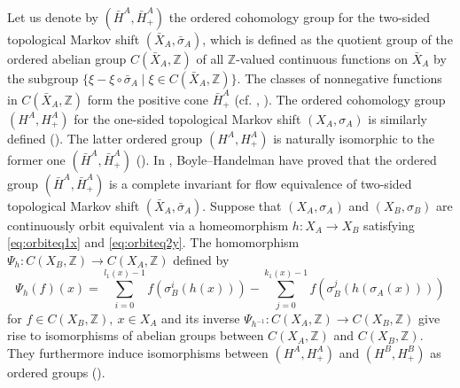 \documentclass[11pt]{article}
\theoremstyle{plain}
\theoremstyle{definition}
\numberwithin{equation}{section}
\newcommand{\Z}{\mathbb{Z}}
\begin{document}
Let us denote by
$(\bar{H}^A,\bar{H}^A_+)$
the ordered cohomology group 
for the two-sided topological Markov shift $(\bar{X}_A,\bar{\sigma}_A)$,
which is defined as the quotient group of the ordered abelian group
$C(\bar{X}_A,{\mathbb{Z}})$ of all ${\mathbb{Z}}$-valued continuous functions 
on $\bar{X}_A$ by the subgroup
$\{ \xi - \xi \circ \bar{\sigma}_A \mid \xi \in C(\bar{X}_A,{\mathbb{Z}}) \}$.
The classes of nonnegative functions in $C(\bar{X}_A,{\mathbb{Z}})$ 
form the positive cone $\bar{H}^A_+$ 
(cf. \cite{BH}, \cite{Po}).
The ordered cohomology group
$(H^A,H^A_+)$
for the one-sided topological Markov shift $(X_A,\sigma_A)$
is similarly defined (\cite{MMKyoto}).
The latter ordered group  
$(H^A,H^A_+)$ is naturally isomorphic to the former one  
$(\bar{H}^A,\bar{H}^A_+)$ (\cite[Lemma 3.1]{MMKyoto}).
In \cite{BH}, Boyle--Handelman have proved that 
the ordered group
$(\bar{H}^A,\bar{H}^A_+)$ 
is a complete invariant for  flow equivalence  of 
two-sided topological Markov shift
$(\bar{X}_A, \bar{\sigma}_A)$.
Suppose that $(X_A, \sigma_A)$ and $(X_B,\sigma_B)$ 
are continuously orbit equivalent
via a homeomorphism $h:X_A\rightarrow X_B$
satisfying \eqref{eq:orbiteq1x} and \eqref{eq:orbiteq2y}.
The homomorphism
$\Psi_h: C(X_B,\Z) \rightarrow C(X_A,\Z)$
defined by
\begin{equation}
\Psi_{h}(f)(x)
= \sum_{i=0}^{l_1(x)-1} f(\sigma_B^i(h(x))) 
- \sum_{j=0}^{k_1(x)-1} f(\sigma_B^j(h(\sigma_A(x))))
\label{eq:Psihfx}
\end{equation}
for
$f \in C(X_B,\Z), \ x \in X_A$
and its inverse 
$\Psi_{h^{-1}}: C(X_A,\Z) \rightarrow C(X_B,\Z)$
give rise to isomorphisms of abelian groups
between $C(X_A,\Z)$ and $C(X_B,\Z)$.
They furthermore 
induce isomorphisms between  
$(H^A,H^A_+)$ and 
$(H^B,H^B_+)$
as ordered groups
(\cite{MMPre2014}).
\end{document}
